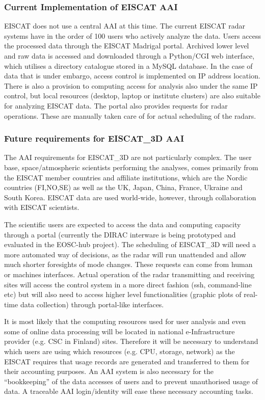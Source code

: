 \documentclass[fleqn,11pt]{wlscirep}
\begin{document}
{\subsubsection{Current Implementation of EISCAT AAI}
EISCAT does not use a central AAI at this time. The current EISCAT radar systems have in the order of 100 users who actively analyze the data. Users access the processed data through the EISCAT Madrigal portal\cite{madrigal}. Archived lower level and raw data is accessed and downloaded through a Python/CGI web interface, which utilises a directory catalogue stored in a MySQL database. In the case of data that is under embargo, access control is implemented on IP address location. There is also a provision to computing access for analysis also under the same IP control, but local resources (desktop, laptop or institute clusters) are also suitable for analyzing EISCAT data. The portal also provides requests for radar operations. These are manually taken care of for actual scheduling of the radars.

\subsubsection{Future requirements for EISCAT\_3D AAI}
The AAI requirements for EISCAT\_3D are not particularly complex. The user base, space/atmospheric scientists performing the analyses, comes primarily from the EISCAT member countries and affiliate institutions, which are the Nordic countries (FI,NO,SE) as well as the UK, Japan, China, France, Ukraine and South Korea. EISCAT data are used world-wide, however, through collaboration with EISCAT scientists.

The scientific users are expected to access the data and computing capacity through a portal (currently the DIRAC interware is being prototyped and evaluated in the EOSC-hub project). The scheduling of EISCAT\_3D will need a more automated way of decisions, as the radar will run unattended and allow much shorter foresights of mode changes. These requests can come from human or machines interfaces. Actual operation of the radar transmitting and receiving sites will access the control system in a more direct fashion (ssh, command-line etc) but will also need to access higher level functionalities (graphic plots of real-time data collection) through portal-like interfaces.

It is most likely that the computing resources used for user analysis and even some of online data processing will be located in national e-Infrastructure provider (e.g. CSC in Finland) sites. 
Therefore it will be necessary to understand which users are using which resources (e.g. CPU, storage, network) as the EISCAT requires that usage records are generated and transferred to them for their accounting purposes. An AAI system is also necessary for the “bookkeeping” of the data accesses of users and to prevent unauthorised usage of data. A traceable AAI login/identity will ease these necessary accounting tasks.

}
\end{document}
